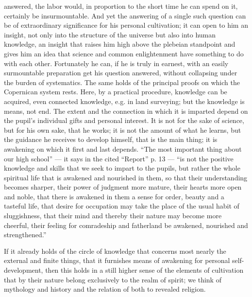 \documentclass[12pt,a4paper,openany]{book}
\newcommand{\opage}[1]{\marginnote{\footnotesize\textit{[#1]}}}
\begin{document}
answered, the labor would, in proportion to the short
time he can spend on it, certainly be insurmountable.
And yet the answering of a single such
question can be of extraordinary significance for his
personal cultivation; it can open to him an insight, not
only into the structure of the universe but also into human
knowledge, an insight that raises him high above the plebeian
standpoint and gives him an idea that
science and common enlightenment have something to do with
each other. Fortunately he can, if he is truly
in earnest, with an easily surmountable preparation
get his question answered, without collapsing
under the burden of systematics. The same holds of
the principal proofs on which the Copernican system
rests. Here, by a practical procedure, knowledge can be acquired,
even connected knowledge,
e.g. in land surveying; but the knowledge is means,
not end. The extent and the connection
in which it is imparted depend on the pupil's individual
gifts and personal interest. It is not for the sake of science,
but for his own sake, that he works;
it is not the amount of what he learns, but
the guidance he receives to develop himself, that is
the main thing; it is awakening on which it first and
last depends. ``The most important thing about our high school'' ---
it says in the cited ``Report'' p. 13 --- ``is not the
positive knowledge and skills that we seek to
impart to the pupils, but rather the whole spiritual life
that is awakened and nourished in them, so that their
\setcounter{footnote}{0}%
\opage{422}understanding becomes sharper, their power of judgment more mature, their %
hearts more open and noble, that there is awakened in them
a sense for order, beauty and a tasteful life, that desire for
occupation may take the place of the usual
habit of sluggishness, that their mind and thereby their nature
may become more cheerful, their feeling for comradeship
and fatherland be awakened, nourished and strengthened.''

If it already holds of the circle of knowledge
that concerns most nearly the external and finite things, that
it furnishes means of awakening for personal self-development,
then this holds in a still higher sense of the elements of cultivation
that by their nature belong exclusively
to the realm of spirit; we think of mythology and history
and the relation of both to revealed religion.
\end{document}
